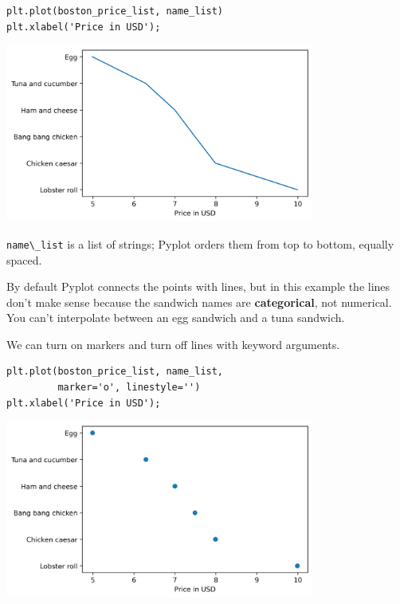 \begin{lstlisting}[]
plt.plot(boston_price_list, name_list)
plt.xlabel('Price in USD');
\end{lstlisting}

\begin{center}
\includegraphics[width=4in]{06_plotting_files/06_plotting_39_0.png}
\end{center}

\passthrough{\lstinline!name\_list!} is a list of strings; Pyplot orders
them from top to bottom, equally spaced.

By default Pyplot connects the points with lines, but in this example
the lines don't make sense because the sandwich names are
\textbf{categorical}, not numerical. You can't interpolate between an
egg sandwich and a tuna sandwich.

We can turn on markers and turn off lines with keyword arguments.

\begin{lstlisting}[]
plt.plot(boston_price_list, name_list, 
         marker='o', linestyle='')
plt.xlabel('Price in USD');
\end{lstlisting}

\begin{center}
\includegraphics[width=4in]{06_plotting_files/06_plotting_41_0.png}
\end{center}

